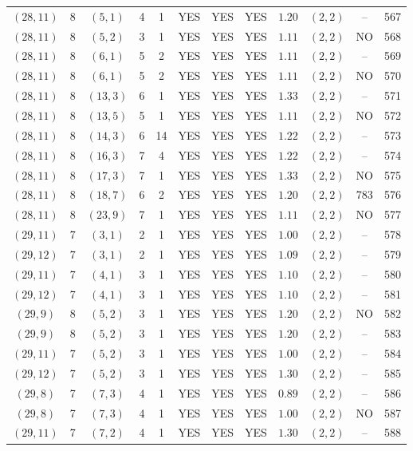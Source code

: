 \begin{longtable}{|c|c|c|c|c|c|c|c|c|c|c|c|}
$(28,11)$ & 8 & $(5,1)$ & 4 & 1 & YES & YES & YES & $1.20$ & $(2,2)$ & -- & 567\\
$(28,11)$ & 8 & $(5,2)$ & 3 & 1 & YES & YES & YES & $1.11$ & $(2,2)$ & NO & 568\\
$(28,11)$ & 8 & $(6,1)$ & 5 & 2 & YES & YES & YES & $1.11$ & $(2,2)$ & -- & 569\\
$(28,11)$ & 8 & $(6,1)$ & 5 & 2 & YES & YES & YES & $1.11$ & $(2,2)$ & NO & 570\\
$(28,11)$ & 8 & $(13,3)$ & 6 & 1 & YES & YES & YES & $1.33$ & $(2,2)$ & -- & 571\\
$(28,11)$ & 8 & $(13,5)$ & 5 & 1 & YES & YES & YES & $1.11$ & $(2,2)$ & NO & 572\\
$(28,11)$ & 8 & $(14,3)$ & 6 & 14 & YES & YES & YES & $1.22$ & $(2,2)$ & -- & 573\\
$(28,11)$ & 8 & $(16,3)$ & 7 & 4 & YES & YES & YES & $1.22$ & $(2,2)$ & -- & 574\\
$(28,11)$ & 8 & $(17,3)$ & 7 & 1 & YES & YES & YES & $1.33$ & $(2,2)$ & NO & 575\\
$(28,11)$ & 8 & $(18,7)$ & 6 & 2 & YES & YES & YES & $1.20$ & $(2,2)$ & 783 & 576\\
$(28,11)$ & 8 & $(23,9)$ & 7 & 1 & YES & YES & YES & $1.11$ & $(2,2)$ & NO & 577\\
$(29,11)$ & 7 & $(3,1)$ & 2 & 1 & YES & YES & YES & $1.00$ & $(2,2)$ & -- & 578\\
$(29,12)$ & 7 & $(3,1)$ & 2 & 1 & YES & YES & YES & $1.09$ & $(2,2)$ & -- & 579\\
$(29,11)$ & 7 & $(4,1)$ & 3 & 1 & YES & YES & YES & $1.10$ & $(2,2)$ & -- & 580\\
$(29,12)$ & 7 & $(4,1)$ & 3 & 1 & YES & YES & YES & $1.10$ & $(2,2)$ & -- & 581\\
$(29,9)$ & 8 & $(5,2)$ & 3 & 1 & YES & YES & YES & $1.20$ & $(2,2)$ & NO & 582\\
$(29,9)$ & 8 & $(5,2)$ & 3 & 1 & YES & YES & YES & $1.20$ & $(2,2)$ & -- & 583\\
$(29,11)$ & 7 & $(5,2)$ & 3 & 1 & YES & YES & YES & $1.00$ & $(2,2)$ & -- & 584\\
$(29,12)$ & 7 & $(5,2)$ & 3 & 1 & YES & YES & YES & $1.30$ & $(2,2)$ & -- & 585\\
$(29,8)$ & 7 & $(7,3)$ & 4 & 1 & YES & YES & YES & $0.89$ & $(2,2)$ & -- & 586\\
$(29,8)$ & 7 & $(7,3)$ & 4 & 1 & YES & YES & YES & $1.00$ & $(2,2)$ & NO & 587\\
$(29,11)$ & 7 & $(7,2)$ & 4 & 1 & YES & YES & YES & $1.30$ & $(2,2)$ & -- & 588\\

\end{longtable}
